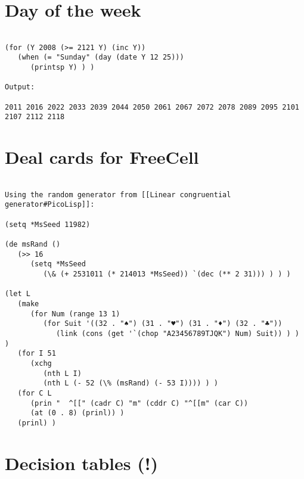 \section*{Day of the week}

\begin{verbatim}

(for (Y 2008 (>= 2121 Y) (inc Y))
   (when (= "Sunday" (day (date Y 12 25)))
      (printsp Y) ) )

Output:

2011 2016 2022 2033 2039 2044 2050 2061 2067 2072 2078 2089 2095 2101 2107 2112 2118

\end{verbatim}

\section*{Deal cards for FreeCell}

\begin{verbatim}

Using the random generator from [[Linear congruential generator#PicoLisp]]:

(setq *MsSeed 11982)

(de msRand ()
   (>> 16
      (setq *MsSeed
         (\& (+ 2531011 (* 214013 *MsSeed)) `(dec (** 2 31))) ) ) )

(let L
   (make
      (for Num (range 13 1)
         (for Suit '((32 . "♠") (31 . "♥") (31 . "♦") (32 . "♣"))
            (link (cons (get '`(chop "A23456789TJQK") Num) Suit)) ) ) )
   (for I 51
      (xchg
         (nth L I)
         (nth L (- 52 (\% (msRand) (- 53 I)))) ) )
   (for C L
      (prin "  ^[[" (cadr C) "m" (cddr C) "^[[m" (car C))
      (at (0 . 8) (prinl)) )
   (prinl) )

\end{verbatim}

\section*{Decision tables (!)}

